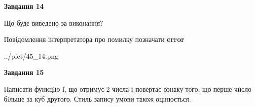 \documentclass[11pt, ukrainian]{article}
\begin{document}
{\begin {large}
{\begin {center}\textbf{Завдання 14}\end {center}}\par
Що буде виведено за виконання? \par
Повідомлення інтерпретатора про помилку позначати \textbf{error}

\begin{center}
	{../pict/45_14.png}
\end{center}
\newpage

{\begin {center}\textbf{Завдання 15}\end {center}}\par

Написати функцiю f, що отримує 2 числа і повертає ознаку того, що перше число бiльше за куб другого. Стиль запису умови також оцінюється.\par
\newpage

\end {large}}
\end{document}
